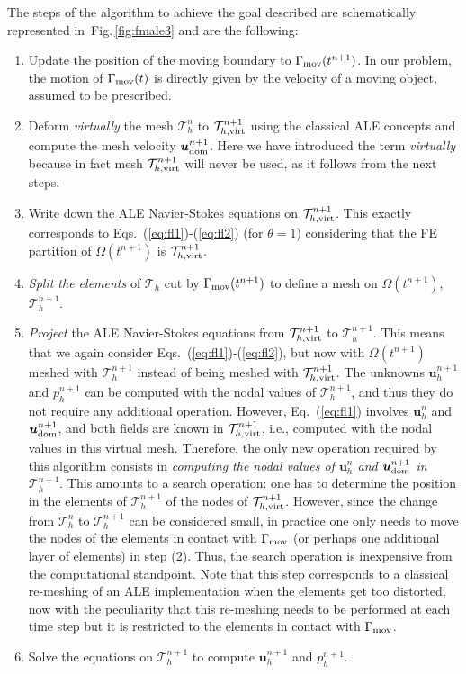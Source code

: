 \documentclass[11pt,a4paper,oneside,reqno]{amsart}
\newcommand{\Eq}[1]{(\ref{eq:#1})}
\newcommand{\Figu}[1]{Fig.\,\ref{fig:#1}}
\def\u{{\bm u}}
\begin{document}
The steps of the algorithm to achieve the goal described are schematically represented in~\Figu{fmale3} and are the following:

\begin{enumerate}
\item Update the position of the moving boundary to  $\Gamma_{\rm mov}(t^{n+1})$. In our problem, the motion of $\Gamma_{\rm mov}(t)$ is directly given by the velocity of a moving object, assumed to be prescribed.
\item Deform {\em virtually} the mesh $\mathcal{T}_h^n$ to $\mathcal{T}^{n+1}_{h,\rm virt}$ using the classical ALE concepts and compute the mesh velocity $\u^{n+1}_{\rm dom}$. Here we have introduced the term {\em virtually} because in fact mesh $\mathcal{T}^{n+1}_{h,\rm virt}$ will never be used, as it follows from the next steps.
\item Write down the ALE Navier-Stokes equations on $\mathcal{T}^{n+1}_{h,\rm virt}$. This exactly corresponds to Eqs.~\Eq{fl1}-\Eq{fl2} (for $\theta = 1$) considering that the FE partition of $\Omega(t^{n+1})$ is $\mathcal{T}^{n+1}_{h,\rm virt}$.
\item {\em Split the elements} of $\mathcal{T}_h$ cut by $\Gamma_{\rm mov}(t^{n+1})$ to define a mesh on $\Omega(t^{n+1})$, $\mathcal{T}_h^{n+1}$.
\item {\em Project} the ALE Navier-Stokes equations from $\mathcal{T}^{n+1}_{h,\rm virt}$ to $\mathcal{T}^{n+1}_{h}$. This means that we again consider Eqs.~\Eq{fl1}-\Eq{fl2}, but now with $\Omega(t^{n+1})$ meshed with $\mathcal{T}^{n+1}_{h}$ instead of being meshed with $\mathcal{T}^{n+1}_{h,\rm virt}$. The unknowns $\u_h^{n+1}$ and $p_h^{n+1}$ can be computed with the nodal values of $\mathcal{T}^{n+1}_{h}$, and thus they do not require any additional operation. However, Eq.~\Eq{fl1} involves $\u_h^n$ and $\u_{\rm dom}^{n+1}$, and both fields are known in $\mathcal{T}^{n+1}_{h,\rm virt}$, i.e., computed with the nodal values in this virtual mesh. Therefore, the only new operation required by this algorithm consists in {\em computing the nodal values of $\u_h^n$ and $\u_{\rm dom}^{n+1}$ in $\mathcal{T}^{n+1}_{h}$}. This amounts to a search operation: one has to determine the position in the elements of $\mathcal{T}^{n+1}_{h}$ of the nodes of $\mathcal{T}^{n+1}_{h,\rm virt}$. However, since the change from $\mathcal{T}^{n}_{h}$ to $\mathcal{T}^{n+1}_{h}$ can be considered small, in practice one only needs to move the nodes of the elements in contact with $\Gamma_{\rm mov}$ (or perhaps one additional layer of elements) in step (2).  Thus, the search operation is inexpensive from the computational standpoint. Note that this step corresponds to a classical re-meshing of an ALE implementation when the elements get too distorted, now with the peculiarity that this re-meshing needs to be performed at each time step but it is restricted to the elements in contact with $\Gamma_{\rm mov}$.
\item Solve the equations on $\mathcal{T}^{n+1}_{h}$ to compute $\u_h^{n+1}$ and $p_h^{n+1}$.
\end{enumerate}
\end{document}
